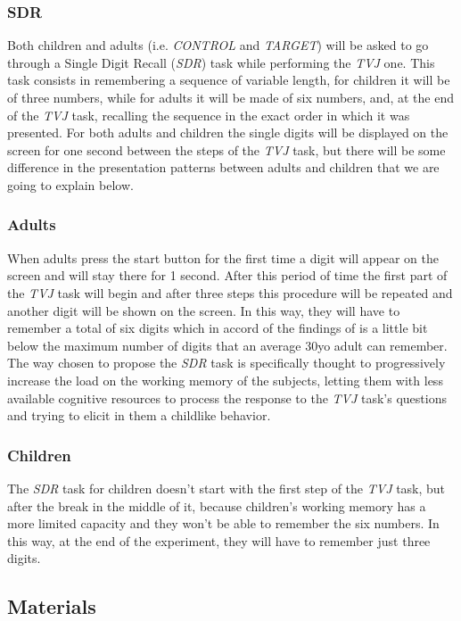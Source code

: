 \documentclass[10pt, a4]{article}
\begin{document}
\subsubsection{SDR}
Both children and adults (i.e. \textit{CONTROL} and \textit{TARGET}) will be asked to go through a Single Digit Recall (\textit{SDR}) task
while performing the \textit{TVJ} one. This task consists in remembering a sequence of variable length, for children it will be of three numbers,
while for adults it will be made of six numbers, and, at the end of the \textit{TVJ} task, recalling the sequence in the exact order
in which it was presented. For both adults and children the single digits will be displayed on the screen for one second between the steps of the
\textit{TVJ} task, but there will be some difference in the presentation patterns between adults and children that we are going to explain below.

\subsubsection{Adults}
When adults press the start button for the first time a digit will appear on the screen and will stay there for 1 second. After this period of time the first part of the \textit{TVJ}
task will begin and after three steps this procedure will be repeated and another digit will be shown on the screen.
In this way, they will have to remember a total of six digits which in accord of the findings of \cite{taub1972comparison}
is a little bit below the maximum number of digits that an average 30yo adult can remember. The way chosen to propose the \textit{SDR} task is specifically
thought to progressively increase the load on the working memory of the subjects, letting them with less available cognitive resources
to process the response to the \textit{TVJ} task's questions and trying to elicit in them a childlike behavior.

\subsubsection{Children}
The \textit{SDR} task for children doesn't start with the first step of the \textit{TVJ} task, but after the break in the middle of it,
because children's working memory has a more limited capacity and they won't be able to remember the six numbers.
In this way, at the end of the experiment, they will have to remember just three digits.


\subsection{Materials}
\end{document}
